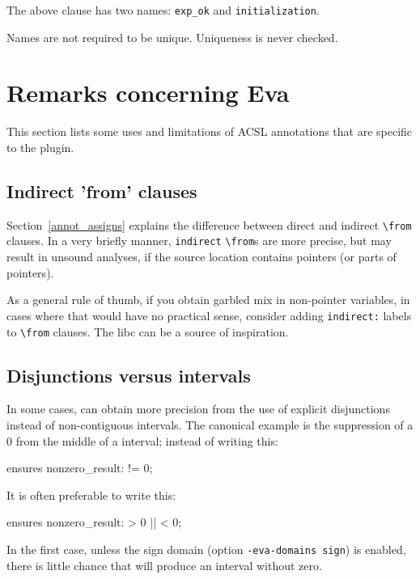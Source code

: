 \documentclass{frama-c-book}
\begin{document}
The above clause has two names: \verb+exp_ok+ and \verb+initialization+.

Names are not required to be unique. Uniqueness is never checked.

\section{Remarks concerning Eva}

This section lists some uses and limitations of ACSL annotations that are
specific to the \Eva{} plugin.

\subsection*{Indirect 'from' clauses}
\label{sec:acsl-guide-indirect}

Section~\ref{annot_assigns} explains the difference between direct
and indirect \verb+\from+ clauses. In a very briefly manner,
\texttt{indirect} \verb+\from+s are more precise, but may result
in unsound analyses, if the source location contains pointers
(or parts of pointers).

As a general rule of thumb, if you obtain garbled mix in non-pointer
variables, in cases where that would have no practical sense, consider
adding \texttt{indirect:} labels to \verb+\from+ clauses. The \FramaC
libc can be a source of inspiration.

\subsection*{Disjunctions versus intervals}

In some cases, \Eva{} can obtain more precision from the use of explicit
disjunctions instead of non-contiguous intervals. The canonical example
is the suppression of a 0 from the middle of a interval; instead of writing
this:

\begin{listing-nonumber}
  ensures nonzero_result: \result != 0;
\end{listing-nonumber}

It is often preferable to write this:

\begin{listing-nonumber}
  ensures nonzero_result: \result > 0 || \result < 0;
\end{listing-nonumber}

In the first case, unless the sign domain (option \texttt{-eva-domains sign})
is enabled, there is little chance that \Eva{} will produce an interval without
zero.
\end{document}
